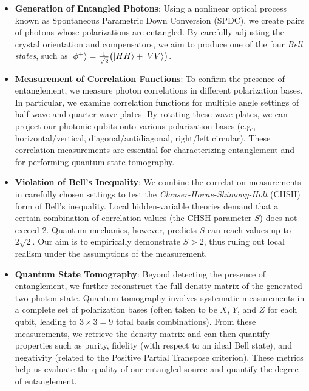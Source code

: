 \begin{itemize}
    \item \textbf{Generation of Entangled Photons}: Using a nonlinear optical process known as Spontaneous Parametric Down Conversion (SPDC), we create pairs of photons whose polarizations are entangled. By carefully adjusting the crystal orientation and compensators, we aim to produce one of the four \emph{Bell states}, such as $\ket{\phi^+} = \frac{1}{\sqrt{2}}\bigl(\ket{HH} + \ket{VV}\bigr)$. 
    
    \item \textbf{Measurement of Correlation Functions}: To confirm the presence of entanglement, we measure photon correlations in different polarization bases. In particular, we examine correlation functions for multiple angle settings of half-wave and quarter-wave plates. By rotating these wave plates, we can project our photonic qubits onto various polarization bases (e.g., horizontal/vertical, diagonal/antidiagonal, right/left circular). These correlation measurements are essential for characterizing entanglement and for performing quantum state tomography.

    \item \textbf{Violation of Bell’s Inequality}: We combine the correlation measurements in carefully chosen settings to test the \emph{Clauser-Horne-Shimony-Holt} (CHSH) form of Bell’s inequality. Local hidden-variable theories demand that a certain combination of correlation values (the CHSH parameter $S$) does not exceed 2. Quantum mechanics, however, predicts $S$ can reach values up to $2\sqrt{2}$. Our aim is to empirically demonstrate $S>2$, thus ruling out local realism under the assumptions of the measurement.

    \item \textbf{Quantum State Tomography}: Beyond detecting the presence of entanglement, we further reconstruct the full density matrix of the generated two-photon state. Quantum tomography involves systematic measurements in a complete set of polarization bases (often taken to be $X$, $Y$, and $Z$ for each qubit, leading to $3\times 3 = 9$ total basis combinations). From these measurements, we retrieve the density matrix and can then quantify properties such as purity, fidelity (with respect to an ideal Bell state), and negativity (related to the Positive Partial Transpose criterion). These metrics help us evaluate the quality of our entangled source and quantify the degree of entanglement.

\end{itemize}

